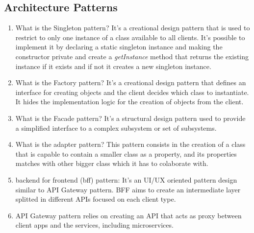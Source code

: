 \subsection{Architecture Patterns}
\begin{multicols}{2}
\begin{enumerate}
\item What is the Singleton pattern? It's a creational design pattern that is used to restrict to only one instance of a class available to all clients. It's possible to implement it by declaring a static singleton instance and making the constructor private and create a \emph{getInstance} method that returns the existing instance if it exists and if not it creates a new singleton instance.
\item What is the Factory pattern? It's a creational design pattern that defines an interface for creating objects and the client decides which class to instantiate. It hides the implementation logic for the creation of objects from the client.
\item What is the Facade pattern? It's a structural design pattern used to provide a simplified interface to a complex subsystem or set of subsystems.
\item What is the adapter pattern? This pattern consists in the creation of a class that is capable to contain a smaller class as a property, and its properties matches with other bigger class which it has to colaborate with.
\item backend for frontend (bff) pattern: It's an UI/UX oriented pattern design similar to API Gateway pattern. BFF aims to create an intermediate layer splitted in different APIs focused on each client type.
\item API Gateway pattern relies on creating an API that acts as proxy between client apps and the services, including microservices.
\end{enumerate}
\end{multicols}

